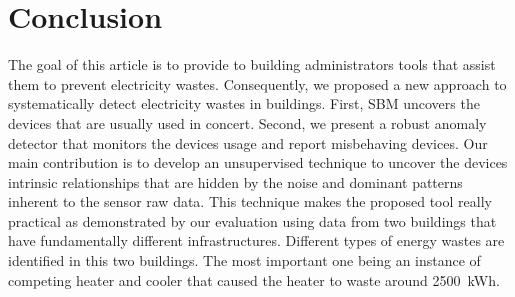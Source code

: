 \section{Conclusion}
The goal of this article is to provide to building administrators tools that assist them to prevent electricity wastes.
Consequently, we proposed a new approach to systematically detect electricity wastes in buildings.
First, SBM uncovers the devices that are usually used in concert.
Second, we present a robust anomaly detector that monitors the devices usage and report misbehaving devices.
Our main contribution is to develop an unsupervised technique to uncover the devices intrinsic relationships that are hidden by the noise and dominant patterns inherent to the sensor raw data.
This technique makes the proposed tool really practical as demonstrated by our evaluation using data from two buildings that have fundamentally different infrastructures.
Different types of energy wastes are identified in this two buildings. 
The most important one being an instance of competing heater and cooler that caused the heater to waste around 2500~kWh.



